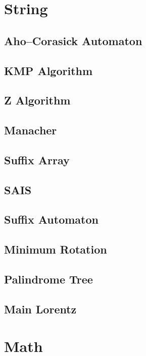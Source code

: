 \section{String}
\subsection{Aho–Corasick Automaton}

\subsection{KMP Algorithm}

\subsection{Z Algorithm}
\subsection{Manacher}
\subsection{Suffix Array}
\subsection{SAIS}
\subsection{Suffix Automaton}

\subsection{Minimum Rotation}
\subsection{Palindrome Tree}

\subsection{Main Lorentz}

\section{Math}
% 
